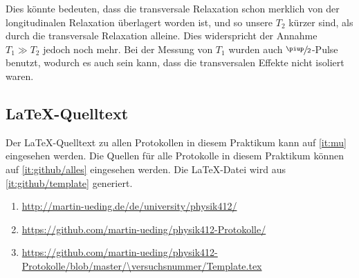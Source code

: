Dies könnte bedeuten, dass die transversale Relaxation schon merklich von der
longitudinalen Relaxation überlagert worden ist, und so unsere $T_2$ kürzer
sind, als durch die transversale Relaxation alleine. Dies widerspricht der
Annahme $T_1 \gg T_2$ jedoch noch mehr. Bei der Messung von $T_1$ wurden
auch $\sfrac\piup2$-Pulse benutzt, wodurch es auch sein kann, dass die
transversalen Effekte nicht isoliert waren.


\FloatBarrier
\begin{appendix}
    \FloatBarrier
    \chapter{\LaTeX-Quelltext}

    Der \LaTeX-Quelltext zu allen Protokollen in diesem Praktikum kann auf
    \ref{it:mu} eingesehen werden. Die Quellen für alle Protokolle in diesem
    Praktikum können auf \ref{it:github/alles} eingesehen werden. Die
    \LaTeX-Datei wird aus \ref{it:github/template} generiert.

    \begin{enumerate}
        \item
            \label{it:mu}
            \url{http://martin-ueding.de/de/university/physik412/}
        \item
            \label{it:github/alles}
            \url{https://github.com/martin-ueding/physik412-Protokolle/}
        \item
            \label{it:github/template}
            \url{https://github.com/martin-ueding/physik412-Protokolle/blob/master/\versuchsnummer/Template.tex}
    \end{enumerate}
\end{appendix}


\FloatBarrier
\printbibliography



